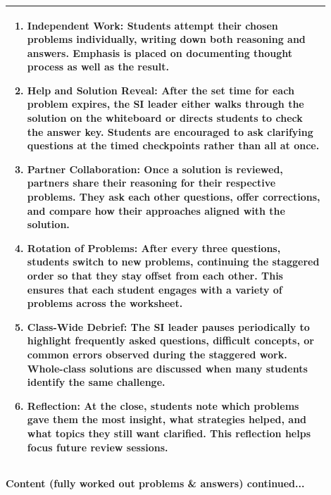 \documentclass{article}
\begin{document}
{\begin{tabular}{|p{0.9\linewidth}|}
\begin{enumerate}
    \item \textbf{Independent Work:} Students attempt their chosen problems individually, writing down both reasoning and answers. Emphasis is placed on documenting thought process as well as the result.
    
    \item \textbf{Help and Solution Reveal:} After the set time for each problem expires, the SI leader either walks through the solution on the whiteboard or directs students to check the answer key. Students are encouraged to ask clarifying questions at the timed checkpoints rather than all at once.
    
    \item \textbf{Partner Collaboration:} Once a solution is reviewed, partners share their reasoning for their respective problems. They ask each other questions, offer corrections, and compare how their approaches aligned with the solution.
    
    \item \textbf{Rotation of Problems:} After every three questions, students switch to new problems, continuing the staggered order so that they stay offset from each other. This ensures that each student engages with a variety of problems across the worksheet.
    
    \item \textbf{Class-Wide Debrief:} The SI leader pauses periodically to highlight frequently asked questions, difficult concepts, or common errors observed during the staggered work. Whole-class solutions are discussed when many students identify the same challenge.
    
    \item \textbf{Reflection:} At the close, students note which problems gave them the most insight, what strategies helped, and what topics they still want clarified. This reflection helps focus future review sessions.
\end{enumerate}\\
\hline
\end{tabular}
\newpage
\noindent
{\large\textbf{Content (fully worked out problems \& answers) continued...}}\\[0.2em]
\vspace{0.2cm}

}
\end{document}
